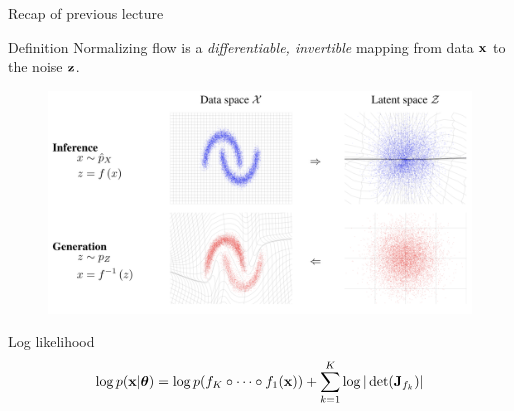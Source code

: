 \begin{frame}{Recap of previous lecture}
	\begin{block}{Definition}
		Normalizing flow is a \textit{differentiable, invertible} mapping from data $\mathbf{x}$ to the noise $\mathbf{z}$. 
	\end{block}
	\vspace{-0.1cm}
	\begin{figure}
		\includegraphics[width=0.85\linewidth]{figs/flows_how2}
	\end{figure}
	\vspace{-0.5cm}
	\begin{block}{Log likelihood}
		\vspace{-0.5cm}
		\[
			\log p(\mathbf{x} | \boldsymbol{\theta}) = \log p(f_K \circ \dots \circ f_1(\mathbf{x})) + \sum_{k=1}^K\log |\det (\mathbf{J}_{f_k})|
		\]
	\end{block}
\end{frame}
